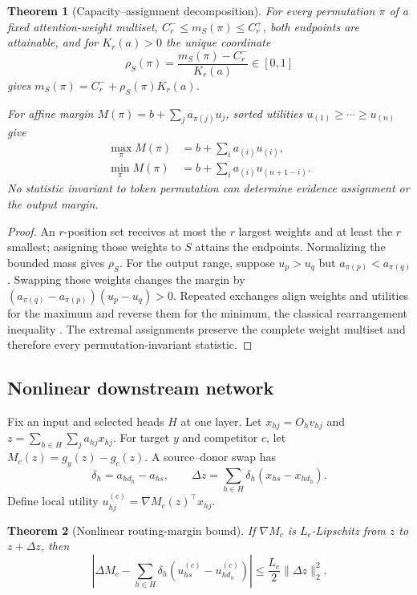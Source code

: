 \documentclass[letterpaper]{article} %
\newtheorem{theorem}{Theorem}
\begin{document}
\begin{theorem}[Capacity--assignment decomposition]
For every permutation $\pi$ of a fixed attention-weight multiset,
$C_r^-\le m_S(\pi)\le C_r^+$, both endpoints are attainable, and for $K_r(a)>0$ the unique coordinate
\begin{equation}
\rho_S(\pi)=\frac{m_S(\pi)-C_r^-}{K_r(a)}\in[0,1]
\end{equation}
gives $m_S(\pi)=C_r^-+\rho_S(\pi)K_r(a)$.

For affine margin $M(\pi)=b+\sum_ja_{\pi(j)}u_j$, sorted utilities
$u_{(1)}\ge\cdots\ge u_{(n)}$ give
\begin{align}
\max_\pi M(\pi)&=b+\sum_i a_{(i)}u_{(i)},\\
\min_\pi M(\pi)&=b+\sum_i a_{(i)}u_{(n+1-i)}.
\end{align}
No statistic invariant to token permutation can determine evidence assignment or the output margin.
\end{theorem}

\begin{proof}
An $r$-position set receives at most the $r$ largest weights and at least the $r$ smallest; assigning those
weights to $S$ attains the endpoints. Normalizing the bounded mass gives $\rho_S$. For the output range,
suppose $u_p>u_q$ but $a_{\pi(p)}<a_{\pi(q)}$. Swapping those weights changes the margin by
$(a_{\pi(q)}-a_{\pi(p)})(u_p-u_q)>0$. Repeated exchanges align weights and utilities for the maximum and
reverse them for the minimum, the classical rearrangement inequality \citep{hardylittlewoodpolya1952}.
The extremal assignments preserve the complete weight multiset and therefore every permutation-invariant
statistic.
\end{proof}

\subsection{Nonlinear downstream network}

Fix an input and selected heads $H$ at one layer. Let $x_{hj}=O_hv_{hj}$ and
$z=\sum_{h\in H}\sum_j a_{hj}x_{hj}$. For target $y$ and competitor $c$, let
$M_c(z)=g_y(z)-g_c(z)$. A source--donor swap has
\begin{equation}
\delta_h=a_{hd_h}-a_{hs},\qquad
\Delta z=\sum_{h\in H}\delta_h(x_{hs}-x_{hd_h}).
\end{equation}
Define local utility $u_{hj}^{(c)}=\nabla M_c(z)^\top x_{hj}$.

\begin{theorem}[Nonlinear routing-margin bound]
If $\nabla M_c$ is $L_c$-Lipschitz from $z$ to $z+\Delta z$, then
\begin{equation}
\left|\Delta M_c-
\sum_{h\in H}\delta_h(u_{hs}^{(c)}-u_{hd_h}^{(c)})\right|
\le\frac{L_c}{2}\lVert\Delta z\rVert_2^2.
\label{eq:supp-nonlinear}
\end{equation}
\end{theorem}
\end{document}
